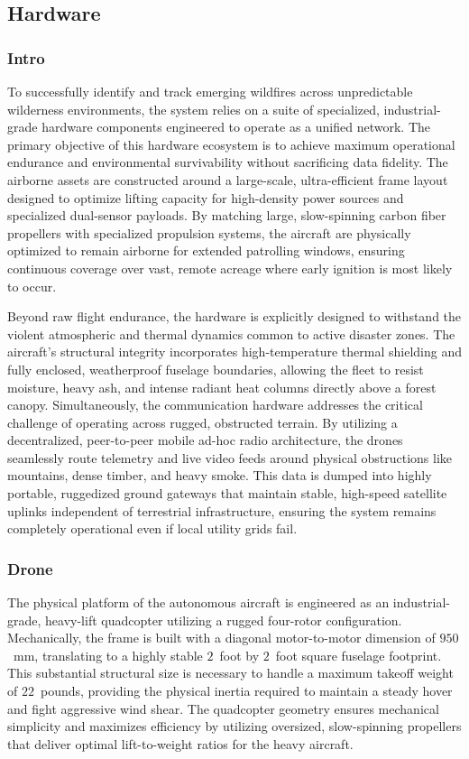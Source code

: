 \documentclass[journal, onecolumn]{IEEEtran}
\begin{document}
\subsection{Hardware}

\subsubsection{Intro}
To successfully identify and track emerging wildfires across unpredictable wilderness environments, the system relies on a suite of specialized, industrial-grade hardware components engineered to operate as a unified network. The primary objective of this hardware ecosystem is to achieve maximum operational endurance and environmental survivability without sacrificing data fidelity. The airborne assets are constructed around a large-scale, ultra-efficient frame layout designed to optimize lifting capacity for high-density power sources and specialized dual-sensor payloads. By matching large, slow-spinning carbon fiber propellers with specialized propulsion systems, the aircraft are physically optimized to remain airborne for extended patrolling windows, ensuring continuous coverage over vast, remote acreage where early ignition is most likely to occur.

Beyond raw flight endurance, the hardware is explicitly designed to withstand the violent atmospheric and thermal dynamics common to active disaster zones. The aircraft's structural integrity incorporates high-temperature thermal shielding and fully enclosed, weatherproof fuselage boundaries, allowing the fleet to resist moisture, heavy ash, and intense radiant heat columns directly above a forest canopy. Simultaneously, the communication hardware addresses the critical challenge of operating across rugged, obstructed terrain. By utilizing a decentralized, peer-to-peer mobile ad-hoc radio architecture, the drones seamlessly route telemetry and live video feeds around physical obstructions like mountains, dense timber, and heavy smoke. This data is dumped into highly portable, ruggedized ground gateways that maintain stable, high-speed satellite uplinks independent of terrestrial infrastructure, ensuring the system remains completely operational even if local utility grids fail.
\subsubsection{Drone}
The physical platform of the autonomous aircraft is engineered as an industrial-grade, heavy-lift quadcopter utilizing a rugged four-rotor configuration. Mechanically, the frame is built with a diagonal motor-to-motor dimension of $950$~mm, translating to a highly stable $2$~foot by $2$~foot square fuselage footprint. This substantial structural size is necessary to handle a maximum takeoff weight of $22$~pounds, providing the physical inertia required to maintain a steady hover and fight aggressive wind shear. The quadcopter geometry ensures mechanical simplicity and maximizes efficiency by utilizing oversized, slow-spinning propellers that deliver optimal lift-to-weight ratios for the heavy aircraft.
\end{document}
